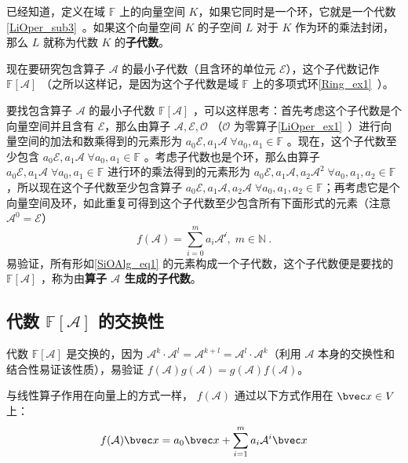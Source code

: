 
已经知道，定义在域 $\mathbb{F}$ 上的向量空间 $K$，如果它同时是一个环，它就是一个代数\autoref{LiOper_sub3}~。如果这个向量空间 $K$ 的子空间 $L$ 对于 $K$ 作为环的乘法封闭，那么 $L$ 就称为代数 $K$ 的\textbf{子代数}。

现在要研究包含算子 $\mathcal{A}$ 的最小子代数（且含环的单位元 $\mathcal{E}$），这个子代数记作 $\mathbb{F}[\mathcal A]$ （之所以这样记，是因为这个子代数是域 $\mathbb{F}$ 上的多项式环\autoref{Ring_ex1}~）。

要找包含算子 $\mathcal{A}$ 的最小子代数 $\mathbb{F}[\mathcal A]$ ，可以这样思考：首先考虑这个子代数是个向量空间并且含有 $\mathcal{E}$，那么由算子 $\mathcal{A,E,O}$ （$\mathcal{O}$ 为零算子\autoref{LiOper_ex1}~）进行向量空间的加法和数乘得到的元素形为 $a_0\mathcal{E},a_1\mathcal{A}\;\forall a_0,a_1\in\mathbb{F}$ 。现在，这个子代数至少包含 $a_0\mathcal{E},a_1\mathcal{A}\;\forall a_0,a_1\in\mathbb{F}$ 。考虑子代数也是个环，那么由算子 $a_0\mathcal{E},a_1\mathcal{A}\;\forall a_0,a_1\in\mathbb{F}$ 进行环的乘法得到的元素形为 $a_0\mathcal{E},a_1\mathcal{A},a_2\mathcal{A}^2\;\forall a_0,a_1,a_2\in\mathbb{F}$，所以现在这个子代数至少包含算子 $a_0\mathcal{E},a_1\mathcal{A},a_2\mathcal{A}\;\forall a_0,a_1,a_2\in\mathbb{F}$；再考虑它是个向量空间及环，如此重复可得到这个子代数至少包含所有下面形式的元素（注意 $\mathcal{A}^0=\mathcal{E}$）
\begin{equation}\label{SiOAlg_eq1}
f(\mathcal{A})=\sum_{i=0}^ma_i\mathcal{A^i},\;m\in\mathbb{N}~.
\end{equation}
易验证，所有形如\autoref{SiOAlg_eq1} 的元素构成一个子代数，这个子代数便是要找的 $\mathbb{F}[\mathcal A]$ ，称为由\textbf{算子 $\mathcal{A}$ 生成的子代数}。
\subsection{代数 $\mathbb{F}[\mathcal{A}]$ 的交换性}
代数 $\mathbb{F}[\mathcal A]$ 是交换的，因为 $\mathcal A^{k}\cdot \mathcal{A}^l=\mathcal{A}^{k+l}=\mathcal A^{l}\cdot \mathcal{A}^k$（利用 $\mathcal{A}$ 本身的交换性和结合性易证该性质），易验证 $f(\mathcal{A})g(\mathcal{A})=g(\mathcal{A})f(\mathcal{A})$。

与线性算子作用在向量上的方式一样， $f(\mathcal{A})$ 通过以下方式作用在 $\bvec x\in V$ 上：
\begin{equation}
f(\mathcal{A})\bvec x=a_0\bvec x+\sum_{i=1}^m a_i\mathcal{A}^i\bvec x
\end{equation}
